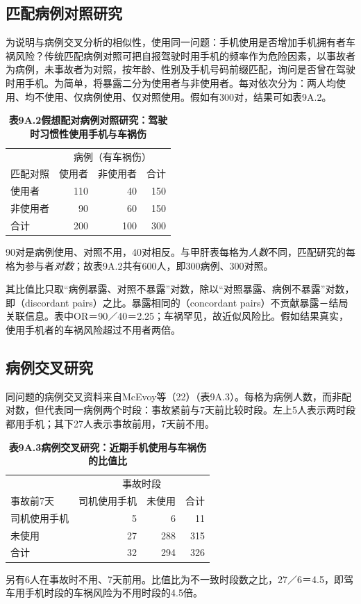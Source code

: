\subsection{匹配病例对照研究}
为说明与病例交叉分析的相似性，使用同一问题：手机使用是否增加手机拥有者车祸风险？传统匹配病例对照可把自报驾驶时用手机的频率作为危险因素，以事故者为病例，未事故者为对照，按年龄、性别及手机号码前缀匹配，询问是否曾在驾驶时用手机。为简单，将暴露二分为使用者与非使用者。每对依次分为：两人均使用、均不使用、仅病例使用、仅对照使用。假如有300对，结果可如表9A.2。

\begin{table}[htbp]\centering\small
\caption*{\textbf{表9A.2\quad 假想配对病例对照研究：驾驶时习惯性使用手机与车祸伤}}
\begin{tabular}{lrrr}\toprule
&\multicolumn{3}{c}{病例（有车祸伤）}\\
匹配对照&使用者&非使用者&合计\\\midrule
使用者&110&40&150\\
非使用者&90&60&150\\
合计&200&100&300\\\bottomrule
\end{tabular}
\end{table}
90对是病例使用、对照不用，40对相反。与甲肝表每格为\emph{人数}不同，匹配研究的每格为参与者\emph{对数}；故表9A.2共有600人，即300病例、300对照。

其比值比只取“病例暴露、对照不暴露”对数，除以“对照暴露、病例不暴露”对数，即（discordant pairs）之比。暴露相同的（concordant pairs）不贡献暴露－结局关联信息。表中OR＝90／40＝2.25；车祸罕见，故近似风险比。假如结果真实，使用手机者的车祸风险超过不用者两倍。

\subsection{病例交叉研究}
同问题的病例交叉资料来自McEvoy等（22）（表9A.3）。每格为病例人数，而非配对数，但代表同一病例两个时段：事故紧前与7天前比较时段。左上5人表示两时段都用手机；其下27人表示事故前用，7天前不用。

\begin{table}[htbp]\centering\small
\caption*{\textbf{表9A.3\quad 病例交叉研究：近期手机使用与车祸伤的比值比}}
\begin{tabular}{lrrr}\toprule
&\multicolumn{3}{c}{事故时段}\\
事故前7天&司机使用手机&未使用&合计\\\midrule
司机使用手机&5&6&11\\
未使用&27&288&315\\
合计&32&294&326\\\bottomrule
\end{tabular}
\end{table}
另有6人在事故时不用、7天前用。比值比为不一致时段数之比，27／6＝4.5，即驾车用手机时段的车祸风险为不用时段的4.5倍。

